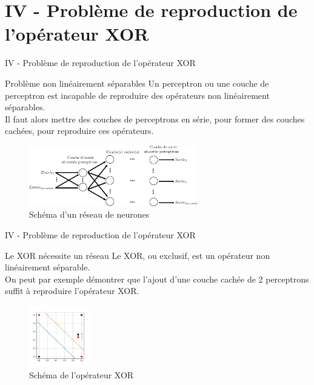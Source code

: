 \documentclass[10pt]{beamer}
\begin{document}
\section{IV - Problème de reproduction de l'opérateur XOR}
\begin{frame}{IV - Problème de reproduction de l'opérateur XOR}
\begin{block}{Problème non linéairement séparables}
Un perceptron ou une couche de perceptron est incapable de reproduire des opérateurs non linéairement séparables. \\
Il faut alors mettre des couches de perceptrons en série, pour former des couches cachées, pour reproduire ces opérateurs. \\
\end{block}
\begin{figure}
	\centering
    \includegraphics[height=100px]{1-Reseau.png}
	\caption{Schéma d'un réseau de neurones}
\end{figure}
\end{frame}

\begin{frame}{IV - Problème de reproduction de l'opérateur XOR}
\begin{block}{Le XOR nécessite un réseau}
Le XOR, ou exclusif, est un opérateur non linéairement séparable. \\
On peut par exemple démontrer que l'ajout d'une couche cachée de 2 perceptrons suffit à reproduire l'opérateur XOR. \\
\begin{figure}
	\centering
    \includegraphics[width=100px]{2-XOR.jpg}
	\caption{Schéma de l'opérateur XOR}
\end{figure}
\end{block}	
\end{frame}
\end{document}
